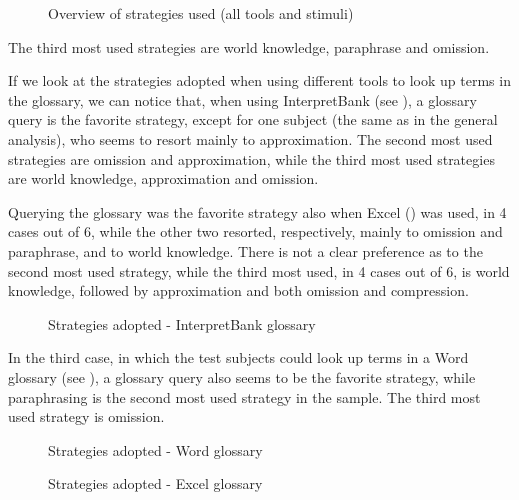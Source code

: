 \documentclass[output=paper]{langsci/langscibook}
\begin{document}
\begin{stylecaption}\begin{figure}
\caption{Overview of strategies used (all tools and stimuli)}
\label{fig:key:15}
\end{figure}\end{stylecaption}

The third most used strategies are world knowledge, paraphrase and omission.

If we look at the strategies adopted when using different tools to look up terms in the glossary, we can notice that, when using InterpretBank (see ), a glossary query is the favorite strategy, except for one subject (the same as in the general analysis), who seems to resort mainly to approximation. The second most used strategies are omission and approximation, while the third most used strategies are world knowledge, approximation and omission.

Querying the glossary was the favorite strategy also when Excel () was used, in 4 cases out of 6, while the other two resorted, respectively, mainly to omission and paraphrase, and to world knowledge. There is not a clear preference as to the second most used strategy, while the third most used, in 4 cases out of 6, is world knowledge, followed by approximation and both omission and compression.

\begin{styleFramecontents}\begin{figure}
\caption{Strategies adopted - InterpretBank glossary}
\label{fig:key:16}
\end{figure}\end{styleFramecontents}

In the third case, in which the test subjects could look up terms in a Word glossary (see ), a glossary query also seems to be the favorite strategy, while paraphrasing is the second most used strategy in the sample. The third most used strategy is omission.

\begin{styleFramecontents}\begin{figure}
\caption{Strategies adopted - Word glossary}
\label{fig:key:18}
\end{figure}\end{styleFramecontents}

\begin{styleFramecontents}\begin{figure}
\caption{Strategies adopted - Excel glossary}
\label{fig:key:17}
\end{figure}\end{styleFramecontents}
\end{document}

